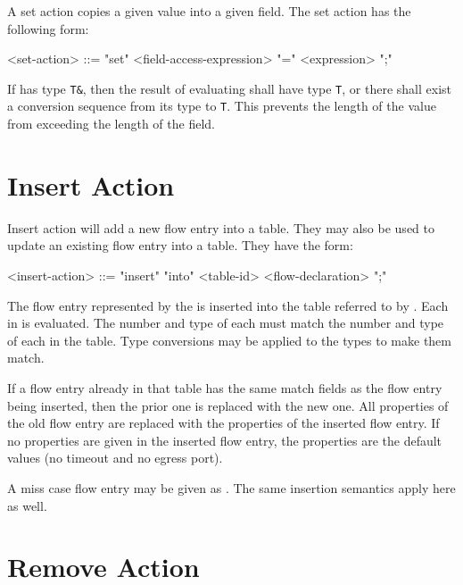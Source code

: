 A set action copies a given value into a given field. The set action has the following form:

\begin{minip}
\begin{grammar}
<set-action> ::= "set" <field-access-expression> "=" <expression> ";"
\end{grammar}
\end{minip}

If  has type \texttt{T\&}, then the result of evaluating  shall have type \texttt{T}, or there shall exist a conversion sequence from its type to \texttt{T}. This prevents the length of the value from exceeding the length of the field.

\section{Insert Action} \label{guide:insert_flow}

Insert action will add a new flow entry into a table. They may also be used to update an existing flow entry into a table. They have the form:

\begin{minip}
\begin{grammar}
<insert-action> ::= "insert" "into" <table-id> <flow-declaration> ";"
\end{grammar}
\end{minip}

The flow entry represented by the  is inserted into the table referred to by . Each  in  is evaluated. The number and type of each  must match the number and type of each  in the table. Type conversions may be applied to the types to make them match. 

If a flow entry already in that table has the same match fields as the flow entry being inserted, then the prior one is replaced with the new one. All properties of the old flow entry are replaced with the properties of the inserted flow entry. If no properties are given in the inserted flow entry, the properties are the default values (no timeout and no egress port).

A miss case flow entry may be given as . The same insertion semantics apply here as well.

\section{Remove Action} \label{guide:remove_flow}

